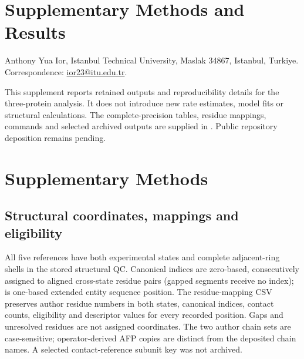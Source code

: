 \section*{Supplementary Methods and Results}
\setcounter{section}{0}
\setcounter{subsection}{0}
\setcounter{table}{0}
\setcounter{figure}{0}
\renewcommand{\thesection}{S\arabic{section}}
\renewcommand{\thetable}{S\arabic{table}}
\renewcommand{\thefigure}{S\arabic{figure}}
\renewcommand{\theHsection}{supp.\arabic{section}}
\renewcommand{\theHtable}{supp.\arabic{table}}
\renewcommand{\theHfigure}{supp.\arabic{figure}}


Anthony Yua Ior, Istanbul Technical University, Maslak 34867, Istanbul, Turkiye. Correspondence: \href{mailto:ior23@itu.edu.tr}{ior23@itu.edu.tr}.

This supplement reports retained outputs and reproducibility details for the three-protein analysis. It does not introduce new rate estimates, model fits or structural calculations. The complete-precision tables, residue mappings, commands and selected archived outputs are supplied in . Public repository deposition remains pending.

\section{Supplementary Methods}

\subsection{Structural coordinates, mappings and eligibility}

All five references have both experimental states and complete adjacent-ring shells in the stored structural QC. Canonical indices are zero-based, consecutively assigned to aligned cross-state residue pairs (gapped segments receive no index);  is one-based extended entity sequence position. The residue-mapping CSV preserves author residue numbers in both states, canonical indices, contact counts, eligibility and descriptor values for every recorded position. Gaps and unresolved residues are not assigned coordinates. The two author chain sets are case-sensitive; operator-derived AFP copies are distinct from the deposited chain names. A selected contact-reference subunit key was not archived.

